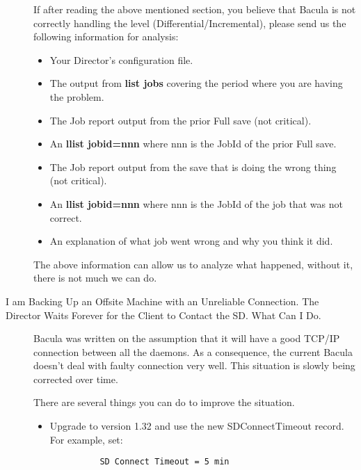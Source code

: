 \begin{description}
   If after reading the above mentioned section, you believe that Bacula  is not
   correctly handling the level (Differential/Incremental),  please send us the
   following information for analysis:  

\begin{itemize}
\item Your Director's configuration file.  
\item The output from {\bf list jobs} covering the period where you  are
   having the problem.  
\item The Job report output from the prior Full save (not critical).  
\item An {\bf llist jobid=nnn} where nnn is the JobId of the prior  Full save.
 
\item The Job report output from the save that is doing the  wrong thing (not
   critical).  
\item An {\bf llist jobid=nnn} where nnn is the JobId of the job  that was not
   correct.  
\item An explanation of what job went wrong and why you think it did.  
   \end{itemize}

The above information can allow us to analyze what happened, without it, 
there is not much we can do.  

\label{WaitForever}
\item [I am Backing Up an Offsite Machine with an Unreliable Connection.
   The  Director Waits Forever for the Client to Contact the SD. What Can  I Do.]
   Bacula was written  on the assumption that it will have a good TCP/IP
   connection  between all the daemons. As a consequence, the current  Bacula
   doesn't deal with faulty connection very well. This situation  is slowly being
   corrected over time.  
   
   There are several things you can do to improve the situation.  

\begin{itemize}
\item Upgrade to version 1.32 and use the new SDConnectTimeout record.  For
   example, set:  

\footnotesize
\begin{verbatim}
          SD Connect Timeout = 5 min
          
\end{verbatim}
\normalsize


\end{itemize}
\end{description}
